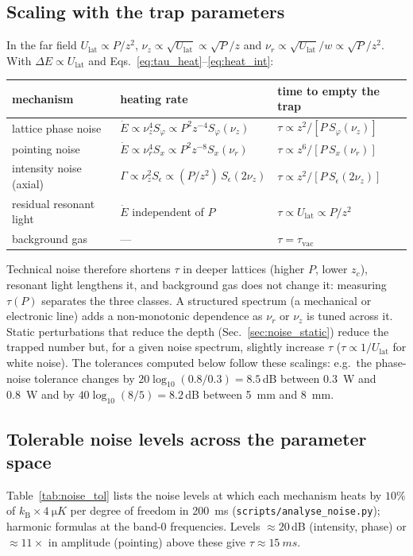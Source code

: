 \documentclass[11pt,a4paper]{article}
\newcommand{\kB}{k_\mathrm{B}}
\newcommand{\Ulat}{U_\mathrm{lat}}
\begin{document}
\subsection{Scaling with the trap parameters}
In the far field $\Ulat\propto P/z^2$, $\nu_z\propto\sqrt{\Ulat}\propto\sqrt P/z$ and $\nu_r\propto\sqrt{\Ulat}/w\propto\sqrt P/z^2$. With $\Delta E\propto\Ulat$ and Eqs.~\eqref{eq:tau_heat}--\eqref{eq:heat_int}:
\begin{center}
\small
\begin{tabular}{@{}lll@{}}
\toprule
mechanism & heating rate & time to empty the trap \\
\midrule
lattice phase noise & $\dot E\propto \nu_z^4S_\varphi\propto P^2z^{-4}S_\varphi(\nu_z)$ & $\tau\propto z^2/[P\,S_\varphi(\nu_z)]$ \\
pointing noise & $\dot E\propto \nu_r^4S_x\propto P^2z^{-8}S_x(\nu_r)$ & $\tau\propto z^6/[P\,S_x(\nu_r)]$ \\
intensity noise (axial) & $\Gamma\propto\nu_z^2S_\epsilon\propto (P/z^2)\,S_\epsilon(2\nu_z)$ & $\tau\propto z^2/[P\,S_\epsilon(2\nu_z)]$ \\
residual resonant light & $\dot E$ independent of $P$ & $\tau\propto\Ulat\propto P/z^2$ \\
background gas & --- & $\tau=\tau_\mathrm{vac}$ \\
\bottomrule
\end{tabular}
\end{center}
Technical noise therefore shortens $\tau$ in deeper lattices (higher $P$, lower $z_c$), resonant light lengthens it, and background gas does not change it: measuring $\tau(P)$ separates the three classes. A structured spectrum (a mechanical or electronic line) adds a non-monotonic dependence as $\nu_r$ or $\nu_z$ is tuned across it. Static perturbations that reduce the depth (Sec.~\ref{sec:noise_static}) reduce the trapped number but, for a given noise spectrum, slightly increase $\tau$ ($\tau\propto1/\Ulat$ for white noise). The tolerances computed below follow these scalings: e.g.\ the phase-noise tolerance changes by $20\log_{10}(0.8/0.3)=8.5$\,dB between \SI{0.3}{W} and \SI{0.8}{W} and by $40\log_{10}(8/5)=8.2$\,dB between \SI{5}{mm} and \SI{8}{mm}.

\subsection{Tolerable noise levels across the parameter space}
Table~\ref{tab:noise_tol} lists the noise levels at which each mechanism heats by $10\%$ of $\kB\times\SI{4}{\micro K}$ per degree of freedom in \SI{200}{ms} (\texttt{scripts/analyse\_noise.py}); harmonic formulas at the band-0 frequencies. Levels $\approx20$\,dB (intensity, phase) or $\approx11\times$ in amplitude (pointing) above these give $\tau\approx\SI{15}{ms}$.
\end{document}
